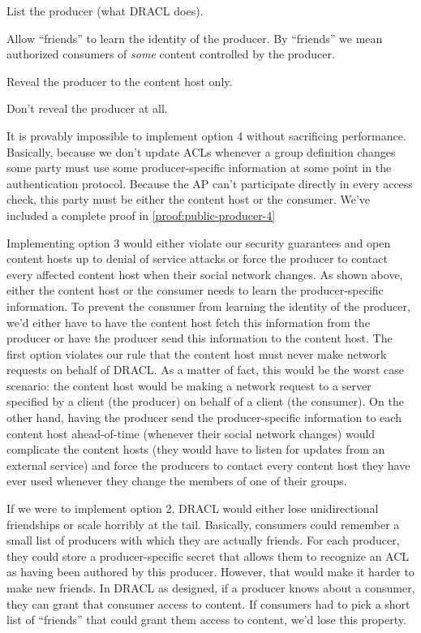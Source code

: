 \documentclass[pdftex,12pt,a4papaer,twoside,notitlepage]{report}
\begin{document}
\begin{compactenum}
\item List the producer (what DRACL does).
\item Allow ``friends'' to learn the identity of the producer. By ``friends'' we
  mean authorized consumers of \emph{some} content controlled by the producer.
\item Reveal the producer to the content host only.
\item Don't reveal the producer at all.
\end{compactenum}

It is provably impossible to implement option 4 without sacrificing
performance. Basically, because we don't update ACLs whenever a group definition
changes some party must use some producer-specific information at some point in
the authentication protocol. Because the AP can't participate directly in every
access check, this party must be either the content host or the consumer. We've
included a complete proof in \cref{proof:public-producer-4}

Implementing option 3 would either violate our security guarantees and open
content hosts up to denial of service attacks or force the producer to contact
every affected content host when their social network changes. As shown above,
either the content host or the consumer needs to learn the producer-specific
information. To prevent the consumer from learning the identity of the producer,
we'd either have to have the content host fetch this information from the
producer or have the producer send this information to the content host. The
first option violates our rule that the content host must never make network
requests on behalf of DRACL\@. As a matter of fact, this would be the worst case
scenario: the content host would be making a network request to a server
specified by a client (the producer) on behalf of a client (the consumer). On
the other hand, having the producer send the producer-specific information to
each content host ahead-of-time (whenever their social network changes) would
complicate the content hosts (they would have to listen for updates from an
external service) and force the producers to contact every content host they
have ever used whenever they change the members of one of their groups.

If we were to implement option 2, DRACL would either lose unidirectional
friendships or scale horribly at the tail. Basically, consumers could remember a
small list of producers with which they are actually friends. For each producer,
they could store a producer-specific secret that allows them to recognize an ACL
as having been authored by this producer. However, that would make it harder to
make new friends. In DRACL as designed, if a producer knows about a consumer,
they can grant that consumer access to content. If consumers had to pick a short
list of ``friends'' that could grant them access to content, we'd lose this
property.
\end{document}

